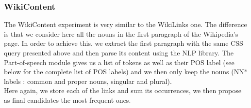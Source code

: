 \subsubsection{WikiContent} %
\label{ssub:wikicontent}
The WikiContent experiment is very similar to the WikiLinks one. The difference is that we consider here all the nouns in the first paragraph of the Wikipedia's page. In order to achieve this, we extract the first paragraph with the same CSS query presented above and then parse its content using the NLP library. The Part-of-speech module gives us a list of tokens as well as their POS label (see below for the complete list of POS labels) and we then only keep the nouns (NN* labels : common and proper nouns, singular and plural).\\
Here again, we store each of the links and sum its occurrences, we then propose as final candidates the most frequent ones.
